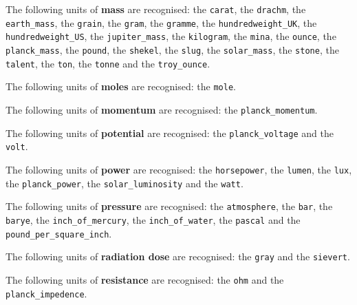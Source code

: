 \noindent The following units of {\bf mass} are recognised:\newline
\noindent the {\tt carat}, the {\tt drachm}, the {\tt earth\_\-mass}, the {\tt grain}, the {\tt gram}, the {\tt gramme}, the {\tt hundredweight\_\-UK}, the {\tt hundredweight\_\-US}, the {\tt jupiter\_\-mass}, the {\tt kilogram}, the {\tt mina}, the {\tt ounce}, the {\tt planck\_\-mass}, the {\tt pound}, the {\tt shekel}, the {\tt slug}, the {\tt solar\_\-mass}, the {\tt stone}, the {\tt talent}, the {\tt ton}, the {\tt tonne} and the {\tt troy\_\-ounce}.\vspace{5mm}

\noindent The following units of {\bf moles} are recognised:\newline
\noindent the {\tt mole}.\vspace{5mm}

\noindent The following units of {\bf momentum} are recognised:\newline
\noindent the {\tt planck\_\-momentum}.\vspace{5mm}

\noindent The following units of {\bf potential} are recognised:\newline
\noindent the {\tt planck\_\-voltage} and the {\tt volt}.\vspace{5mm}

\noindent The following units of {\bf power} are recognised:\newline
\noindent the {\tt horsepower}, the {\tt lumen}, the {\tt lux}, the {\tt planck\_\-power}, the {\tt solar\_\-luminosity} and the {\tt watt}.\vspace{5mm}

\noindent The following units of {\bf pressure} are recognised:\newline
\noindent the {\tt atmosphere}, the {\tt bar}, the {\tt barye}, the {\tt inch\_\-of\_\-mercury}, the {\tt inch\_\-of\_\-water}, the {\tt pascal} and the {\tt pound\_\-per\_\-square\_\-inch}.\vspace{5mm}

\noindent The following units of {\bf radiation dose} are recognised:\newline
\noindent the {\tt gray} and the {\tt sievert}.\vspace{5mm}

\noindent The following units of {\bf resistance} are recognised:\newline
\noindent the {\tt ohm} and the {\tt planck\_\-impedence}.\vspace{5mm}

